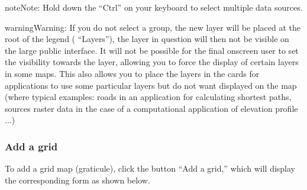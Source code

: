 \documentclass[letterpaper,10pt,english]{sphinxmanual}
\begin{document}

\begin{notice}{note}{Note:}
Hold down the ``Ctrl'' on your keyboard to select multiple data sources.
\end{notice}

\begin{notice}{warning}{Warning:}
If you do not select a group, the new layer will be placed at the root of the legend ( ``Layers''), the layer in question will then not be visible on the large public interface. It will not be possible for the final onscreen user to set the visibility towards the layer, allowing you to force the display of certain layers in some maps. This also allows you to place the layers in the cards for applications to use some particular layers but do not want displayed on the map (where typical examples: roads in an application for calculating shortest paths, sources raster data in the case of a computational application of elevation profile ...)
\end{notice}


\subsubsection{Add a grid}
\label{maps/layerstree:ajouter-une-grille}
To add a grid map (graticule), click the button ``Add a grid,'' which will display the corresponding form as shown below.
\end{document}
